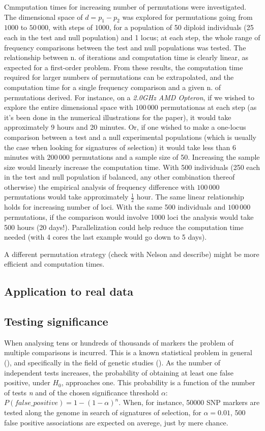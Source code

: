 \documentclass{bmcart}
\begin{document}
Cmmputation times for increasing
number of permutations were investigated. The dimensional space of $d=p_1-p_2$ was
explored for permutations going from $1000$ to $50\,000$, with steps of
$1000$, for a population of 50 diploid individuals (25 each in the test
and null population) and 1 locus; at each step, the whole range of frequency comparisons between
the test and null populations was tested. The relationship between n. of
iterations and computation time is clearly linear, as expected for a
first-order problem. From these results, the
computation time required for larger numbers of permutations can be
extrapolated, and the computation time for a single frequency comparison
and a given n. of permutations derived. For instance, on a \emph{2.0GHz
  AMD Opteron}, if we wished to
explore the entire dimensional space with $100\,000$ permutationas at
each step (as
it's been done in the numerical illustrations for the paper), it would
take approximately 9 hours and 20 minutes.
Or, if one wished to make a one-locus comparison between a test and a null
experimental populations (which is usually the case when looking for
signatures of selection) it would take less than 6 minutes with
$200\,000$ permutations and a sample size of 50. Increasing the sample
size would linearly increase the computation time. With 500 individuals
(250 each in the test and null population if balanced, any other
combination thereof otherwise) the empirical analysis of frequency
difference with $100\,000$ permutations would take approximately $\frac{1}{2}$ hour. The same linear relationship
holds for increasing number of loci. With the same 500 individuals and
$100\,000$ permutations, if
the comparison would involve 1000 loci the analysis would take 500 hours
(20 days!). Parallelization could help reduce
the computation time needed (with 4 cores the last example would go down to 5 days).

A different permutation strategy (check with Nelson and describe) might
be more efficient and computation times.

\subsection*{Application to real data}

\subsection*{Testing significance}

When analysing tens or hundreds of thousands of markers the problem of
multiple comparisons is incurred. This is a known statistical problem in general
(\cite{berry2007difficult}), and specifically in the field of genetic
studies (\cite{lander1994genetic,risch1996future}). As the number of
independent tests increases, the probability of obtaining at least one
false positive, under $H_0$, approaches one. This probability is a
function of the number of tests \emph{n} and of the chosen significance
threshold \emph{\(\alpha\)}: \(P(false\_positive)=1-(1-\alpha)^n\). When, for instance,
50000 SNP markers are tested along the genome in search of signatures of
selection, for $\alpha=0.01$, 500 false positive associations are expected on averege, just
by mere chance. 
\end{document}
